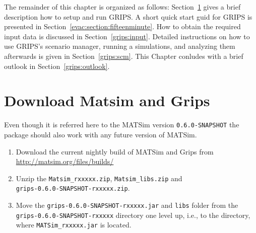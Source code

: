The remainder of this chapter is organized as follows: Section~\ref{grips:install} gives a brief description how to setup and run GRIPS. 
A short quick start guid for GRIPS is presented in Section~\ref{evac:section:fifteenminute}. How to obtain the required input data is discussed in Section~\ref{grips:input}. Detailed instructions on how to use GRIPS's scenario manager, running a simulations, and analyzing them afterwards is given in  Section~\ref{grips:scm}. This Chapter conludes with a brief outlook in Section~\ref{grips:outlook}.


\section{Download Matsim and Grips}\label{grips:install}
Even though it is referred here to the MATSim version \lstinline|0.6.0-SNAPSHOT| the package should also work with any future version of MATSim.
\begin{enumerate}
\item 
Download the current nightly build of MATSim and Grips from
\url{http://matsim.org/files/builds/}
\item 
Unzip the \lstinline|Matsim_rxxxxx.zip|, \lstinline|Matsim_libs.zip| and\\
 \lstinline|grips-0.6.0-SNAPSHOT-rxxxxx.zip|.
\item 
Move the \lstinline|grips-0.6.0-SNAPSHOT-rxxxxx.jar| and \lstinline|libs| folder from the \lstinline|grips-0.6.0-SNAPSHOT-rxxxxx| directory one level up, 
i.e., to the directory, where \lstinline|MATSim_rxxxxx.jar| is located.
\end{enumerate}

